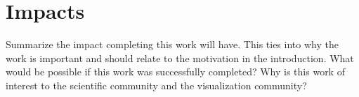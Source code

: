 \section{Impacts}
\label{sec:impact}

Summarize the impact completing this work will have. This ties into why the
work is important and should relate to the motivation in the introduction.
What would be possible if this work was successfully completed? Why is this work of
interest to the scientific community and the visualization community?
